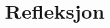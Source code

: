 \documentclass[main.tex]{subfiles}
\begin{document}
\section{Refleksjon}
\label{sec:2}
\end{document}
